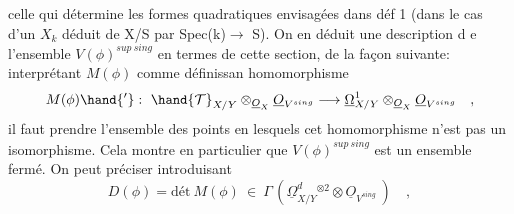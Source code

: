 celle qui détermine les formes quadratiques envisagées dans déf 1
(dans le cas  d'un $X_k$ déduit de X/S par Spec(k)$\rightarrow$ S). On
en déduit une description d e l'ensemble $V(\phi)^{sup\ sing}$ en termes de
cette section, de la façon suivante: interprétant $M(\phi)$ comme définissan
homomorphisme
\[
M(\phi)\hand{'} : \ \hand{\mathcal{T}}_{X/Y} \otimes_{\underline{O}_X} \underline{O}_{V^{sing}} \longrightarrow \underline{\Omega}^1_{X/Y} \otimes_{\underline{O}_X} \underline{O}_{V^{sing}} \quad ,
\]
il faut prendre l'ensemble des points en lesquels cet homomorphisme
n'est pas un isomorphisme. Cela montre en particulier que $V(\phi)^{sup\ sing}$
est un ensemble fermé. On peut  préciser  introduisant
\[
D(\phi) = \text{dét}\ M(\phi) \ \in \ \Gamma\,(\underline{\Omega}^d_{X/Y}{}^{\otimes 2} \otimes \underline{O}_{V^{sing}}\ ) \quad ,
\]

